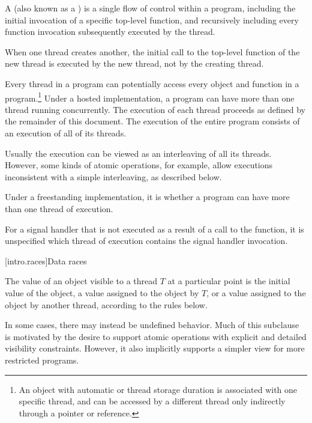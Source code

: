 \pnum
{}%
%
A  (also known as a ) is a single flow of
control within a program, including the initial invocation of a specific
top-level function, and recursively including every function invocation
subsequently executed by the thread.
\begin{note}
When one thread creates another,
the initial call to the top-level function of the new thread is executed by the
new thread, not by the creating thread.
\end{note}
Every thread in a program can
potentially access every object and function in a program.\footnote{An object
with automatic or thread storage duration is associated with
one specific thread, and can be accessed by a different thread only indirectly
through a pointer or reference.} Under a hosted
implementation, a \Cpp{} program can have more than one thread running
concurrently. The execution of each thread proceeds as defined by the remainder
of this document. The execution of the entire program consists of an execution
of all of its threads.
\begin{note}
Usually the execution can be viewed as an
interleaving of all its threads. However, some kinds of atomic operations, for
example, allow executions inconsistent with a simple interleaving, as described
below.
\end{note}
Under a freestanding implementation, it is  whether a program can
have more than one thread of execution.

\pnum
For a signal handler that is not executed as a result of a call to the
 function, it is unspecified which thread of execution
contains the signal handler invocation.

[intro.races]{Data races}

\pnum
The value of an object visible to a thread $T$ at a particular point is the
initial value of the object, a value assigned to the object by $T$, or a
value assigned to the object by another thread, according to the rules below.
\begin{note}
In some cases, there may instead be undefined behavior. Much of this
subclause is motivated by the desire to support atomic operations with explicit
and detailed visibility constraints. However, it also implicitly supports a
simpler view for more restricted programs.
\end{note}

